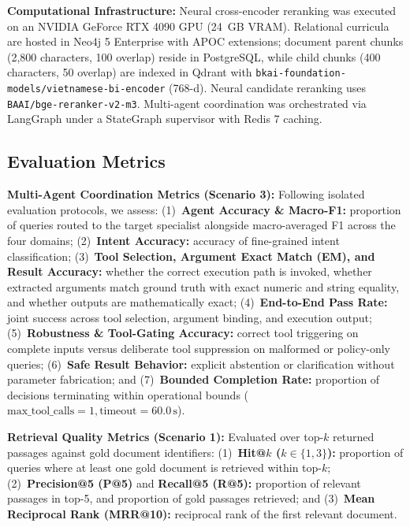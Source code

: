 \noindent\textbf{Computational Infrastructure:} Neural cross-encoder reranking was executed on an NVIDIA GeForce RTX 4090 GPU (24~GB VRAM). Relational curricula are hosted in Neo4j 5 Enterprise with APOC extensions; document parent chunks (2,800 characters, 100 overlap) reside in PostgreSQL, while child chunks (400 characters, 50 overlap) are indexed in Qdrant with \texttt{bkai-foundation-models/vietnamese-bi-encoder} (768-d). Neural candidate reranking uses \texttt{BAAI/bge-reranker-v2-m3}. Multi-agent coordination was orchestrated via LangGraph under a StateGraph supervisor with Redis 7 caching.

\subsection{Evaluation Metrics}
\label{sec:metrics}

\textbf{Multi-Agent Coordination Metrics (Scenario 3):} Following isolated evaluation protocols, we assess: (1)~\textbf{Agent Accuracy \& Macro-F1:} proportion of queries routed to the target specialist alongside macro-averaged F1 across the four domains; (2)~\textbf{Intent Accuracy:} accuracy of fine-grained intent classification; (3)~\textbf{Tool Selection, Argument Exact Match (EM), and Result Accuracy:} whether the correct execution path is invoked, whether extracted arguments match ground truth with exact numeric and string equality, and whether outputs are mathematically exact; (4)~\textbf{End-to-End Pass Rate:} joint success across tool selection, argument binding, and execution output; (5)~\textbf{Robustness \& Tool-Gating Accuracy:} correct tool triggering on complete inputs versus deliberate tool suppression on malformed or policy-only queries; (6)~\textbf{Safe Result Behavior:} explicit abstention or clarification without parameter fabrication; and (7)~\textbf{Bounded Completion Rate:} proportion of decisions terminating within operational bounds ($\text{max\_tool\_calls}=1, \text{timeout}=60.0\,\text{s}$).

\textbf{Retrieval Quality Metrics (Scenario 1):} Evaluated over top-$k$ returned passages against gold document identifiers: (1)~\textbf{Hit@$k$ ($k \in \{1, 3\}$):} proportion of queries where at least one gold document is retrieved within top-$k$; (2)~\textbf{Precision@5 (P@5)} and \textbf{Recall@5 (R@5):} proportion of relevant passages in top-5, and proportion of gold passages retrieved; and (3)~\textbf{Mean Reciprocal Rank (MRR@10):} reciprocal rank of the first relevant document.

